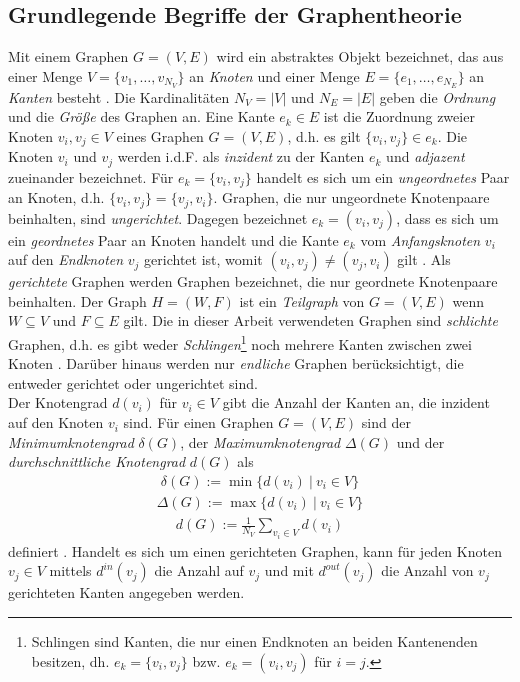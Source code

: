 \documentclass[12pt, a4paper]{report}
\begin{document}
\subsection{Grundlegende Begriffe der Graphentheorie}\label{Grundlegende Begriffe der Graphentheorie}
Mit einem Graphen $G=(V,E)$ wird ein abstraktes Objekt bezeichnet, das aus einer Menge $V=\{v_1,\dots,v_{N_V}\}$ an \textit{Knoten} und einer Menge $E=\{e_1,\dots,e_{N_E}\}$ an \textit{Kanten} besteht \cite{brandes2005graphfunda}. Die Kardinalitäten $N_V =|V|$ und $N_E=|E|$ geben die \textit{Ordnung} und die \textit{Größe} des Graphen an. Eine Kante $e_k \in E$ ist die Zuordnung zweier Knoten $v_i,v_j \in V$ eines Graphen $G=(V,E)$, d.h. es gilt $\{v_i,v_j\} \in e_k$. Die Knoten $v_i$ und $v_j$ werden \mbox{i.d.F.} als \textit{inzident} zu der Kanten $e_k$ und \textit{adjazent} zueinander bezeichnet. Für $e_k=\{v_i,v_j\}$ handelt es sich um ein \textit{ungeordnetes} Paar an Knoten, d.h. $\{v_i,v_j\}=\{v_j,v_i\}$. Graphen, die nur ungeordnete Knotenpaare beinhalten, sind \textit{ungerichtet}. Dagegen bezeichnet $e_k=(v_i,v_j)$, dass es sich um ein \textit{geordnetes} Paar an Knoten handelt und die Kante $e_k$ vom \textit{Anfangsknoten} $v_i$ auf den \textit{Endknoten} $v_j$ gerichtet ist, womit $(v_i,v_j) \neq (v_j, v_i)$ gilt \cite{kolaczyk2009statistical}. Als \textit{gerichtete} Graphen werden Graphen bezeichnet, die nur geordnete Knotenpaare beinhalten. Der Graph $H=(W,F)$ ist ein \textit{Teilgraph} von $G=(V,E)$ wenn $W \subseteq V$ und $F \subseteq E$ gilt. Die in dieser Arbeit verwendeten Graphen sind \textit{schlichte} Graphen, d.h. es gibt weder \textit{Schlingen}\footnote{ Schlingen sind Kanten, die nur einen Endknoten an beiden Kantenenden besitzen, dh. $e_k=\{v_i,v_j\}$ bzw. $e_k=(v_i,v_j)$ für $i=j$.} noch mehrere Kanten zwischen zwei Knoten \cite{tittmann2011graphen}. Darüber hinaus werden nur \textit{endliche} Graphen berücksichtigt, die entweder gerichtet oder ungerichtet sind.\\

Der Knotengrad $d(v_i)$ für $v_i \in V$ gibt die Anzahl der Kanten an, die inzident auf den Knoten $v_i$ sind. Für einen Graphen $G=(V,E)$ sind der \textit{Minimumknotengrad} $\delta(G)$, der \textit{Maximumknotengrad} $\Delta(G)$ und der \textit{durchschnittliche Knotengrad} $d(G)$ als
\begin{align}
\delta(G):=\min\{d(v_i) \ | \ v_i \in V\}
\end{align}
\begin{align}
\Delta(G):=\max\{d(v_i) \ | \ v_i \in V\}
\end{align}
\begin{align}
d(G):=\frac{1}{N_V}\sum_{v_i \in V}d(v_i)
\end{align}
definiert \cite{diestel2006graph}. Handelt es sich um einen gerichteten Graphen, kann für jeden Knoten $v_j \in V$ mittels $d^{in}(v_j)$ die Anzahl auf $v_j$ und mit $d^{out}(v_j)$ die Anzahl von $v_j$ gerichteten Kanten angegeben werden.\\
\end{document}
